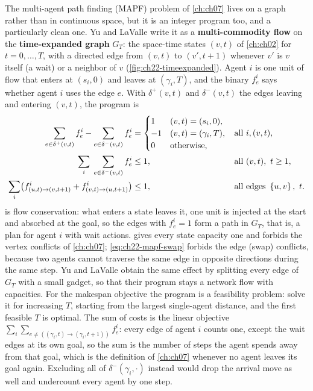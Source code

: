 The multi-agent path finding (MAPF) problem of \cref{ch:ch07} lives on a
graph rather than in continuous space, but it is an integer program too, and a particularly
clean one. Yu and LaValle \cite{yu2016optimal} write it as a
\textbf{multi-commodity flow} on the \textbf{time-expanded graph} $G_T$: the space-time states $(v, t)$ of \cref{ch:ch02} for $t = 0,
\dots, T$, with a directed edge from $(v, t)$ to $(v', t+1)$ whenever $v'$
is $v$ itself (a wait) or a neighbor of $v$
(\cref{fig:ch22-timeexpanded}). Agent $i$ is one unit of flow that enters
at $(s_i, 0)$ and leaves at $(\gamma_i, T)$, and the binary $f^i_e$ says whether
agent $i$ uses the edge $e$. With $\delta^+(v,t)$ and $\delta^-(v,t)$ the
edges leaving and entering $(v, t)$, the program is
\begin{subequations}
\label{eq:ch22-mapf-ilp}
\begin{align}
  \sum_{e \in \delta^+(v,t)} f^i_e - \sum_{e \in \delta^-(v,t)} f^i_e &=
  \begin{cases} 1 & (v,t) = (s_i, 0),\\ -1 & (v,t) = (\gamma_i, T),\\
    0 & \text{otherwise,}\end{cases}
  & &\text{all } i, (v,t), \label{eq:ch22-mapf-flow}\\
  \sum_{i} \;\sum_{e \in \delta^-(v,t)} f^i_e &\le 1,
  & &\text{all } (v,t),\ t \ge 1, \label{eq:ch22-mapf-cap}\\
  \sum_{i} \bigl( f^i_{(u,t)\to(v,t+1)} + f^i_{(v,t)\to(u,t+1)} \bigr) &\le 1,
  & &\text{all edges } \left\{ u,v \right\},\ t. \label{eq:ch22-mapf-swap}
\end{align}
\end{subequations}
 is flow conservation: what enters a state leaves
it, one unit is injected at the start and absorbed at the goal, so the
edges with $f^i_e = 1$ form a path in $G_T$, that is, a plan for agent $i$
with wait actions.  gives every state capacity one
and forbids the vertex conflicts of \cref{ch:ch07};
\cref{eq:ch22-mapf-swap} forbids the edge (swap) conflicts, because two
agents cannot traverse the same edge in opposite directions during the same
step. Yu and LaValle obtain the same effect by splitting every edge of
$G_T$ with a small gadget, so that their program stays a network flow with
capacities. For the makespan objective the program is a feasibility
problem: solve it for increasing $T$, starting from the largest single-agent
distance, and the first feasible $T$ is optimal. The sum of costs is the
linear objective $\sum_i \sum_{e \neq ((\gamma_i,t)\to(\gamma_i,t+1))} f^i_e$: every
edge of agent $i$ counts one, except the wait edges at its own goal, so the
sum is the number of steps the agent spends away from that goal, which is
the definition of \cref{ch:ch07} whenever no agent leaves its goal again.
Excluding all of $\delta^-(\gamma_i,\cdot)$ instead would drop the arrival move
as well and undercount every agent by one step.

